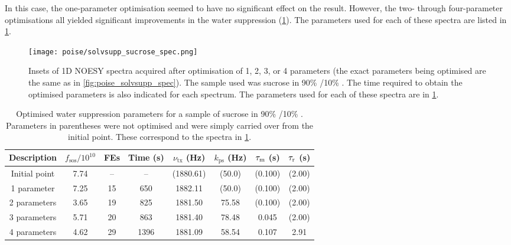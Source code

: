 In this case, the one-parameter optimisation seemed to have no significant effect on the result.
However, the two- through four-parameter optimisations all yielded significant improvements in the water suppression (\cref{fig:poise_solvsupp_sucrose_spec}).
The parameters used for each of these spectra are listed in \cref{tbl:poise_solvsupp_sucrose}.

\begin{figure}[!ht]
    \centering
    \texttt{[image: poise/solvsupp\_sucrose\_spec.png]}
    \caption[1D NOESY spectra of sucrose sample before and after optimisation]{
        Insets of 1D NOESY spectra acquired after optimisation of 1, 2, 3, or 4 parameters (the exact parameters being optimised are the same as in \cref{fig:poise_solvsupp_spec}).
        The sample used was sucrose in 90\% /10\% .
        The time required to obtain the optimised parameters is also indicated for each spectrum.
        The parameters used for each of these spectra are in \cref{tbl:poise_solvsupp_sucrose}.
    }
    \label{fig:poise_solvsupp_sucrose_spec}
\end{figure}

\begin{table}[!htb]
    \centering
    \begin{tabular}{cccccccc}
        \toprule
        Description   & $f_\mathrm{sos} / 10^{10}$ & FEs & Time (\unit{\s}) & $\nu_\text{tx}$ (\unit{\Hz}) & $k_\text{ps}$ (\unit{\Hz}) & $\tau_\mathrm{m}$ (\unit{\s}) & $\tau_\mathrm{r}$ (\unit{\s}) \\
        \hline
        Initial point & 7.74 & -- & --   & (1880.61) & (50.0) & (0.100) & (2.00) \\
        1 parameter   & 7.25 & 15 & 650  & 1882.11   & (50.0) & (0.100) & (2.00) \\
        2 parameters  & 3.65 & 19 & 825  & 1881.50   & 75.58  & (0.100) & (2.00) \\
        3 parameters  & 5.71 & 20 & 863  & 1881.40   & 78.48  & 0.045   & (2.00) \\
        4 parameters  & 4.62 & 29 & 1396 & 1881.09   & 58.54  & 0.107   & 2.91   \\
        \hline
    \end{tabular}
    \caption[Overview of water suppression optimisations on sucrose sample]{
        Optimised water suppression parameters for a sample of sucrose in 90\% /10\% .
        Parameters in parentheses were not optimised and were simply carried over from the initial point.
        These correspond to the spectra in \cref{fig:poise_solvsupp_sucrose_spec}.
    }
    \label{tbl:poise_solvsupp_sucrose}
\end{table}

